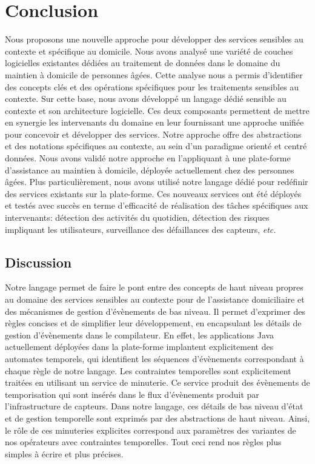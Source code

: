 \chapter{Conclusion}


%
Nous proposons une nouvelle approche pour développer des services sensibles au contexte et spécifique au domicile. Nous avons analysé une variété de couches logicielles existantes dédiées au traitement de données dans le domaine du maintien à domicile de personnes âgées. Cette analyse nous a permis d'identifier des concepts clés et des opérations spécifiques pour les traitements sensibles au contexte. Sur cette base, nous avons développé un langage dédié sensible au contexte et son architecture logicielle. Ces deux composants permettent de mettre en synergie les intervenants du domaine en leur fournissant une approche unifiée pour concevoir et développer des services. Notre approche offre des abstractions et des notations spécifiques au contexte, au sein d'un paradigme orienté et centré données. Nous avons validé notre approche en l'appliquant à une plate-forme d'assistance au maintien à domicile, déployée actuellement chez des personnes âgées. Plus particulièrement, nous avons utilisé notre langage dédié pour redéfinir des services existants sur la plate-forme. Ces nouveaux services ont été déployés et testés avec succès en terme d'efficacité de réalisation des tâches spécifiques aux intervenants: détection des activités du quotidien, détection des risques impliquant les utilisateurs, surveillance des défaillances des capteurs, {\em etc.}

\section{Discussion}

 Notre langage permet de faire le pont entre des concepts de haut niveau propres au domaine des services sensibles au contexte pour de l'assistance domiciliaire et des mécanismes de gestion d'évènements de bas niveau. Il permet d'exprimer des règles concises et de simplifier leur développement, en encapsulant les détails de gestion d'évènements dans le compilateur. En effet, les applications Java actuellement déployées dans la plate-forme implantent explicitement des automates temporels, qui identifient les séquences d'évènements correspondant à chaque règle de notre langage. Les contraintes temporelles sont explicitement traitées en utilisant un service de minuterie. Ce service produit des évènements de temporisation qui sont insérés dans le flux d'évènements produit par l'infrastructure de capteurs. Dans notre langage, ces détails de bas niveau d'état et de gestion temporelle sont exprimés par des abstractions de haut niveau. Ainsi, le rôle de ces minuteries explicites correspond aux paramètres des variantes de nos opérateurs avec contraintes temporelles. Tout ceci rend nos règles plus simples à écrire et plus précises.  \newline

